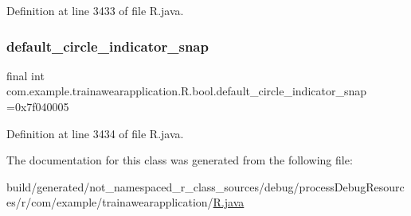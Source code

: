 Definition at line 3433 of file R.\+java.

\mbox{\label{classcom_1_1example_1_1trainawearapplication_1_1_r_1_1bool_a9b060d1e8dac047d3a6e659b17039612}} 
\subsubsection{\texorpdfstring{default\_circle\_indicator\_snap}{default\_circle\_indicator\_snap}}
{\footnotesize\ttfamily final int com.\+example.\+trainawearapplication.\+R.\+bool.\+default\+\_\+circle\+\_\+indicator\+\_\+snap =0x7f040005\hspace{0.3cm}{\ttfamily [static]}}



Definition at line 3434 of file R.\+java.



The documentation for this class was generated from the following file\+:\begin{DoxyCompactItemize}
\item 
build/generated/not\+\_\+namespaced\+\_\+r\+\_\+class\+\_\+sources/debug/process\+Debug\+Resources/r/com/example/trainawearapplication/\mbox{\hyperlink{com_2example_2trainawearapplication_2_r_8java}{R.\+java}}\end{DoxyCompactItemize}
